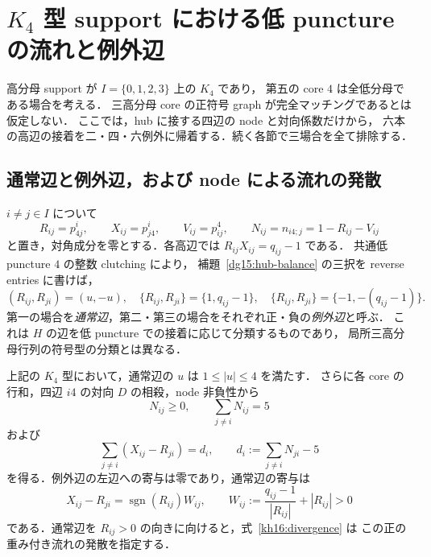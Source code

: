 \section{\texorpdfstring{$K_4$}{K4} 型 support における低 puncture の流れと例外辺}
\label{kh16:section}

高分母 support が $I=\{0,1,2,3\}$ 上の $K_4$ であり，
第五の core $4$ は全低分母である場合を考える．
三高分母 core の正符号 graph が完全マッチングであるとは仮定しない．
ここでは，hub に接する四辺の node と対向係数だけから，
六本の高辺の接着を二・四・六例外に帰着する．続く各節で三場合を全て排除する．

\subsection{通常辺と例外辺，および node による流れの発散}

\begin{definition}\label{kh16:notation}
$i\ne j\in I$ について
\[
 R_{ij}=p^i_{4j},\qquad X_{ij}=p^i_{j4},\qquad
 V_{ij}=p^4_{ij},\qquad N_{ij}=n_{i4;j}=1-R_{ij}-V_{ij}
\]
と置き，対角成分を零とする．各高辺では $R_{ij}X_{ij}=q_{ij}-1$ である．
共通低 puncture $4$ の整数 clutching により，
補題~\ref{dg15:hub-balance} の三択を reverse entries に書けば，
\begin{equation}\label{kh16:edge-options}
 (R_{ij},R_{ji})=(u,-u),\quad
 \{R_{ij},R_{ji}\}=\{1,q_{ij}-1\},\quad
 \{R_{ij},R_{ji}\}=\{-1,-(q_{ij}-1)\}.
\end{equation}
第一の場合を\emph{通常辺}，第二・第三の場合をそれぞれ正・負の\emph{例外辺}と呼ぶ．
これは $H$ の辺を低 puncture での接着に応じて分類するものであり，
局所三高分母行列の符号型の分類とは異なる．
\end{definition}

\begin{lemma}
\label{kh16:flow}
上記の $K_4$ 型において，通常辺の $u$ は $1\leq |u|\leq4$ を満たす．
さらに各 core の行和，四辺 $i4$ の対向 $D$ の相殺，node 非負性から
\begin{equation}\label{kh16:node-budget}
 N_{ij}\geq0,\qquad \sum_{j\ne i}N_{ij}=5
\end{equation}
および
\begin{equation}\label{kh16:divergence}
 \sum_{j\ne i}(X_{ij}-R_{ji})=d_i,
 \qquad d_i:=\sum_{j\ne i}N_{ji}-5
\end{equation}
を得る．例外辺の左辺への寄与は零であり，通常辺の寄与は
\begin{equation}\label{kh16:edge-weight}
 X_{ij}-R_{ji}
 =\operatorname{sgn}(R_{ij})W_{ij},\qquad
 W_{ij}:=\frac{q_{ij}-1}{|R_{ij}|}+|R_{ij}|>0
\end{equation}
である．通常辺を $R_{ij}>0$ の向きに向けると，式~\eqref{kh16:divergence} は
この正の重み付き流れの発散を指定する．
\end{lemma}

